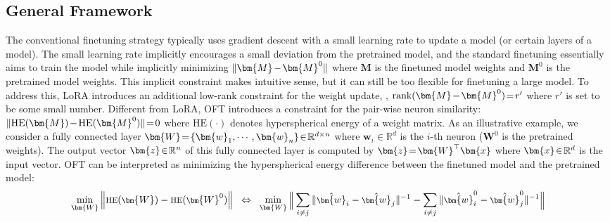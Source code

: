 \vspace{-1.35mm}
\subsection{General Framework}
\vspace{-1mm}

The conventional finetuning strategy typically uses gradient descent with a small learning rate to update a model (or certain layers of a model). The small learning rate implicitly encourages a small deviation from the pretrained model, and the standard finetuning essentially aims to train the model while implicitly minimizing $\thickmuskip=2mu \medmuskip=2mu \| \bm{M} - \bm{M}^0\|$ where $\bm{M}$ is the finetuned model weights and $\bm{M}^0$ is the pretrained model weights. This implicit constraint makes intuitive sense, but it can still be too flexible for finetuning a large model. To address this, LoRA introduces an additional low-rank constraint for the weight update, \ie, $\thickmuskip=2mu \medmuskip=2mu \text{rank}(\bm{M} - \bm{M}^0)=r'$ where $r'$ is set to be some small number. Different from LoRA, OFT introduces a constraint for the pair-wise neuron similarity: $\thickmuskip=2mu \medmuskip=2mu \| \text{HE}(\bm{M})-\text{HE}(\bm{M}^0) \|=0$ where $\text{HE}(\cdot)$ denotes hyperspherical energy of a weight matrix. As an illustrative example, we consider a fully connected layer $\thickmuskip=2mu \medmuskip=2mu \bm{W}=\{\bm{w}_1,\cdots,\bm{w}_n\}\in\mathbb{R}^{d\times n}$ where $\bm{w}_i\in\mathbb{R}^{d}$ is the $i$-th neuron ($\bm{W}^0$ is the pretrained weights). The output vector $\thickmuskip=2mu \medmuskip=2mu \bm{z}\in\mathbb{R}^n$ of this fully connected layer is computed by $\thickmuskip=2mu \medmuskip=2mu \bm{z}=\bm{W}^\top\bm{x}$ where $\thickmuskip=2mu \medmuskip=2mu \bm{x}\in\mathbb{R}^d$ is the input vector. OFT can be interpreted as minimizing the hyperspherical energy difference between the finetuned model and the pretrained model:
\begin{equation}\label{eq:oft_principle}
\footnotesize
\min_{\bm{W}} \left\| \text{HE}(\bm{W})-\text{HE}(\bm{W}^0)\right\|~~\Leftrightarrow~~\min_{\bm{W}} \bigg{\|} \sum_{i\neq j} \|\hat{\bm{w}}_i-\hat{\bm{w}}_j\|^{-1}-\sum_{i\neq j} \|\hat{\bm{w}}^0_i-\hat{\bm{w}}^0_j\|^{-1}\bigg{\|}
\end{equation}
